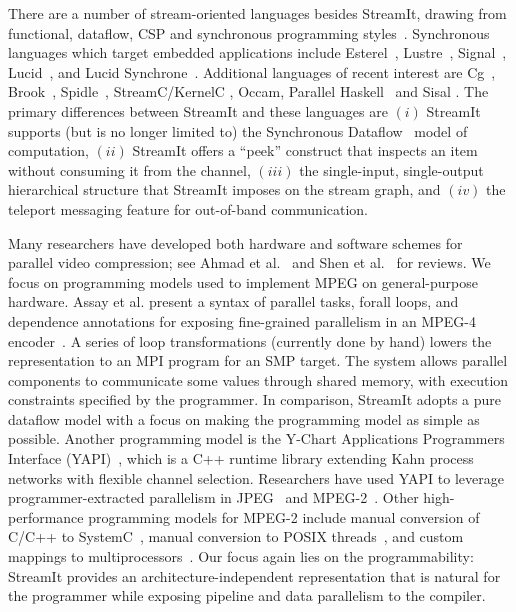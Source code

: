 There are a number of stream-oriented languages besides StreamIt,
drawing from functional, dataflow, CSP and synchronous programming
styles~\cite{survey97}.  Synchronous languages which target embedded
applications include Esterel~\cite{Esterel}, Lustre~\cite{Lustre},
Signal~\cite{Signal}, Lucid~\cite{Lucid77}, and Lucid
Synchrone~\cite{Lucid-Synchrone}.  Additional languages of recent
interest are Cg~\cite{cg03}, Brook~\cite{brook04},
Spidle~\cite{spidle03}, StreamC/KernelC \cite{imagine03ieee},
Occam\cite{Occam}, Parallel Haskell~\cite{ph} and Sisal \cite{sisal}.
The primary differences between StreamIt and these languages are $(i)$
StreamIt supports (but is no longer limited to) the Synchronous
Dataflow~\cite{lee87static} model of computation, $(ii)$ StreamIt
offers a ``peek'' construct that inspects an item without consuming it
from the channel, $(iii)$ the single-input, single-output hierarchical
structure that StreamIt imposes on the stream graph, and $(iv)$ the
teleport messaging feature for out-of-band communication.

Many researchers have developed both hardware and software schemes for
parallel video compression; see Ahmad et al.~\cite{ahmad01compression}
and Shen et al.~\cite{shen94overview} for reviews.  We focus on
programming models used to implement MPEG on general-purpose hardware.
Assay et al. present a syntax of parallel tasks, forall loops, and
dependence annotations for exposing fine-grained parallelism in an
MPEG-4 encoder~\cite{assayad05mpeg4b}.  A series of loop
transformations (currently done by hand) lowers the representation to
an MPI program for an SMP target.  The system allows parallel
components to communicate some values through shared memory, with
execution constraints specified by the programmer.  In comparison,
StreamIt adopts a pure dataflow model with a focus on making the
programming model as simple as possible.  Another programming model is
the Y-Chart Applications Programmers Interface
(YAPI)~\cite{kock00yapi}, which is a C++ runtime library extending
Kahn process networks with flexible channel selection.  Researchers
have used YAPI to leverage programmer-extracted parallelism in
JPEG~\cite{kock02jpeg} and MPEG-2~\cite{dwivedi01exploring}.  Other
high-performance programming models for MPEG-2 include manual
conversion of C/C++ to SystemC~\cite{pazos04soc}, manual conversion to
POSIX threads~\cite{li05alpbench}, and custom mappings to
multiprocessors~\cite{ahmad01multiproc, iwata98coarse}.  Our focus
again lies on the programmability: StreamIt provides an
architecture-independent representation that is natural for the
programmer while exposing pipeline and data parallelism to the
compiler.

